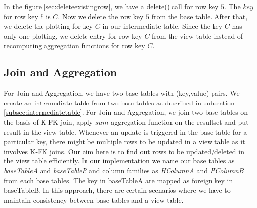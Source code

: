 \documentclass[11pt,a4paper,bibtotoc,idxtotoc,headsepline,footsepline,footexclude,BCOR12mm,DIV13]{scrbook}
\begin{document}
In the figure \ref{sec:deleteexistingrow}, we have a delete() call for row key $5$. The $key$ for row key $5$ is $C$. Now we delete the row key $5$ from the base table. After that, we delete the plotting for key $C$ in our intermediate table. Since the key $C$ has only one plotting, we delete entry for row key $C$ from the view table instead of recomputing aggregation functions for row key $C$. 

\subsection{Join and Aggregation}
\label{subsec:joinandaggregation}

For Join and Aggregation, we have two base tables with (key,value) pairs. We create an intermediate table from two base tables as described in subsection \ref{subsec:intermediatetable}. For Join and Aggregation, we join two base tables on the basis of K-FK join, apply $sum$ aggregation function on the resultset and put result in the view table. Whenever an update is triggered in the base table for a particular key, there might be multiple rows to be updated in a view table as it involves K-FK joins. Our aim here is to find out rows to be updated/deleted in the view table efficiently. In our implementation we name our base tables as \emph{baseTableA} and \emph{baseTableB} and column families as \emph{HColumnA} and \emph{HColumnB} from each base tables. The key in baseTableA are mapped as foreign key in baseTableB. In this approach, there are certain scenarios where we have to maintain consistency between base tables and a view table.




\end{document}
